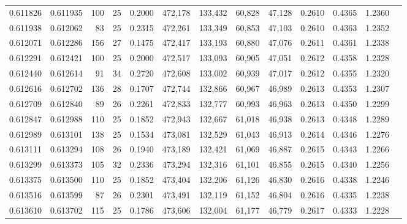 \begin{tabular}{rrrrrrrrrrrrr}
0.611826 & 0.611935 &   100 &  25 &                                     0.2000 & 472,178 & 133,432 &  60,828 &  47,128 & 0.2610 & 0.4365 & 1.2360 \\
0.611938 & 0.612062 &    83 &  25 &                                     0.2315 & 472,261 & 133,349 &  60,853 &  47,103 & 0.2610 & 0.4363 & 1.2352 \\
0.612071 & 0.612286 &   156 &  27 &                                     0.1475 & 472,417 & 133,193 &  60,880 &  47,076 & 0.2611 & 0.4361 & 1.2338 \\
0.612291 & 0.612421 &   100 &  25 &                                     0.2000 & 472,517 & 133,093 &  60,905 &  47,051 & 0.2612 & 0.4358 & 1.2328 \\
0.612440 & 0.612614 &    91 &  34 &                                     0.2720 & 472,608 & 133,002 &  60,939 &  47,017 & 0.2612 & 0.4355 & 1.2320 \\
0.612616 & 0.612702 &   136 &  28 &                                     0.1707 & 472,744 & 132,866 &  60,967 &  46,989 & 0.2613 & 0.4353 & 1.2307 \\
0.612709 & 0.612840 &    89 &  26 &                                     0.2261 & 472,833 & 132,777 &  60,993 &  46,963 & 0.2613 & 0.4350 & 1.2299 \\
0.612847 & 0.612988 &   110 &  25 &                                     0.1852 & 472,943 & 132,667 &  61,018 &  46,938 & 0.2613 & 0.4348 & 1.2289 \\
0.612989 & 0.613101 &   138 &  25 &                                     0.1534 & 473,081 & 132,529 &  61,043 &  46,913 & 0.2614 & 0.4346 & 1.2276 \\
0.613111 & 0.613294 &   108 &  26 &                                     0.1940 & 473,189 & 132,421 &  61,069 &  46,887 & 0.2615 & 0.4343 & 1.2266 \\
0.613299 & 0.613373 &   105 &  32 &                                     0.2336 & 473,294 & 132,316 &  61,101 &  46,855 & 0.2615 & 0.4340 & 1.2256 \\
0.613375 & 0.613500 &   110 &  25 &                                     0.1852 & 473,404 & 132,206 &  61,126 &  46,830 & 0.2616 & 0.4338 & 1.2246 \\
0.613516 & 0.613599 &    87 &  26 &                                     0.2301 & 473,491 & 132,119 &  61,152 &  46,804 & 0.2616 & 0.4335 & 1.2238 \\
0.613610 & 0.613702 &   115 &  25 &                                     0.1786 & 473,606 & 132,004 &  61,177 &  46,779 & 0.2617 & 0.4333 & 1.2228 \\

\end{tabular}
